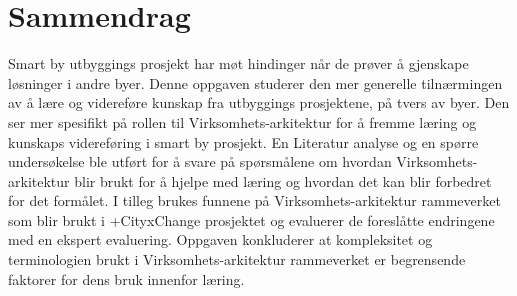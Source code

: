 \chapter*{Sammendrag}
\iffalse
Dokumentklassen \texttt{ntnuthesis} er en tilpasset versjon av \LaTeX' standard \texttt{report}-klasse. Den er tilrettelagt for avhandlinger på alle nivåer – bachelor, master og PhD – og er tilgjengelig på både norsk (bokmål og nynorsk) og engelsk (britisk og amerikansk). Dette dokumentet er ment å tjene (i) som en beskrivelse av dokument\-klassen, (ii) som et eksempel på bruken av den, og (iii) som en mal for avhandlingen.
\fi

Smart by utbyggings prosjekt har møt hindinger når de prøver å gjenskape løsninger i andre byer. Denne oppgaven studerer den mer generelle tilnærmingen av å lære og videreføre kunskap fra utbyggings prosjektene, på tvers av byer. Den ser mer spesifikt på rollen til Virksomhets-arkitektur for å fremme læring og kunskaps videreføring i smart by prosjekt. En Literatur analyse og en spørre undersøkelse ble utført for å svare på spørsmålene om hvordan Virksomhets-arkitektur blir brukt for å hjelpe med læring og hvordan det kan blir forbedret for det formålet. I tilleg brukes funnene på Virksomhets-arkitektur rammeverket som blir brukt i +CityxChange prosjektet og evaluerer de foreslåtte endringene med en ekspert evaluering. Oppgaven konkluderer at kompleksitet og terminologien brukt i Virksomhets-arkitektur rammeverket er begrensende faktorer for dens bruk innenfor læring. 